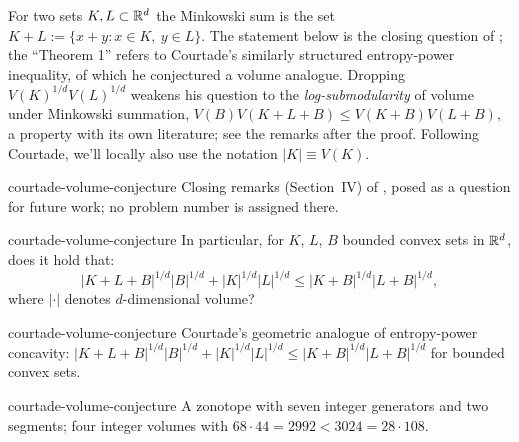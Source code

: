

\begin{cxcredits}
\end{cxcredits}

\begin{cxcontext}
For two sets $K,L\subset\mathbb R^d$ the Minkowski sum is the set
$K+L :=\{x+y:x\in K,\ y\in L\}$. The statement below is the closing question of \citet{Courtade2017Concavity};
the ``Theorem 1'' refers to Courtade's similarly structured entropy-power inequality, of which he conjectured a volume analogue.  Dropping $V(K)^{1/d}V(L)^{1/d}$ weakens his question to the \emph{log-submodularity} of volume under Minkowski
summation, $V(B)V(K+L+B)\le V(K+B)V(L+B)$, a property with its own literature; 
see the remarks after the proof. Following Courtade, we'll locally also use the notation $|K| \equiv V(K)$.
\end{cxcontext}


\begin{cxsource}{courtade-volume-conjecture}
Closing remarks (Section~IV) of \citet{Courtade2017Concavity}, posed as a
question for future work; no problem number is assigned there.
\end{cxsource}

\begin{cxstatement}{courtade-volume-conjecture}
In particular, for $K$, $L$, $B$ bounded convex sets in $\mathbb R^d$, does it hold
that:
\[
|K+L+B|^{1/d}|B|^{1/d}+|K|^{1/d}|L|^{1/d}\le|K+B|^{1/d}|L+B|^{1/d},
\]
where $|\cdot|$ denotes $d$-dimensional volume?
\end{cxstatement}

\begin{cxsummary}{courtade-volume-conjecture}
Courtade's geometric analogue of entropy-power concavity:
$|K{+}L{+}B|^{1/d}|B|^{1/d}+|K|^{1/d}|L|^{1/d}\le|K{+}B|^{1/d}|L{+}B|^{1/d}$
for bounded convex sets.
\end{cxsummary}

\begin{cxcertificate}{courtade-volume-conjecture}
A zonotope with seven integer generators and two segments; four integer
volumes with $68\cdot44=2992<3024=28\cdot108$.
\end{cxcertificate}

